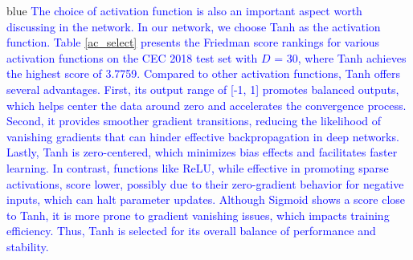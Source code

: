 \documentclass[journal, onecolumn]{IEEEtran}
\begin{document}
\begin{color}{blue}
\textcolor{blue}{
The choice of activation function is also an important aspect worth discussing in the network. In our network, we choose Tanh as the activation function. Table \ref{ac_select} presents the Friedman score rankings for various activation functions on the CEC 2018 test set with $D$ = 30, where Tanh achieves the highest score of 3.7759. Compared to other activation functions, Tanh offers several advantages. First, its output range of [-1, 1] promotes balanced outputs, which helps center the data around zero and accelerates the convergence process. Second, it provides smoother gradient transitions, reducing the likelihood of vanishing gradients that can hinder effective backpropagation in deep networks. Lastly, Tanh is zero-centered, which minimizes bias effects and facilitates faster learning. In contrast, functions like ReLU, while effective in promoting sparse activations, score lower, possibly due to their zero-gradient behavior for negative inputs, which can halt parameter updates. Although Sigmoid shows a score close to Tanh, it is more prone to gradient vanishing issues, which impacts training efficiency. Thus, Tanh is selected for its overall balance of performance and stability.}
\begin{table}[h]
	\centering
	\caption{\textcolor{blue}{Friedman Score Ranking of Different Activation Functions on CEC 2018 in D=30 }}
	\vspace{-2mm}
	\label{ac_select}
	\color{blue}
\end{table}


\end{color}
\end{document}
